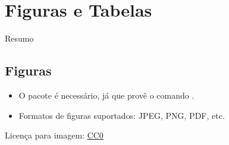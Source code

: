 \documentclass{beamer}
\begin{document}
\section{Figuras e Tabelas}

\begin{frame}{Resumo}
\begin{multicols}{2}
\tableofcontents[currentsection]
\end{multicols}
\end{frame}

\subsection{Figuras}
\begin{frame}[fragile]{\insertsubsection}
\begin{itemize}
  \item O pacote  é necessário, já que provê o comando .
  \item Formatos de figuras suportados: JPEG, PNG, PDF, etc.
\end{itemize}

\tiny{Licença para imagem: \href{https://pixabay.com/en/animal-apple-attractive-beautiful-1239390/}{CC0}}
\end{frame}
\end{document}
